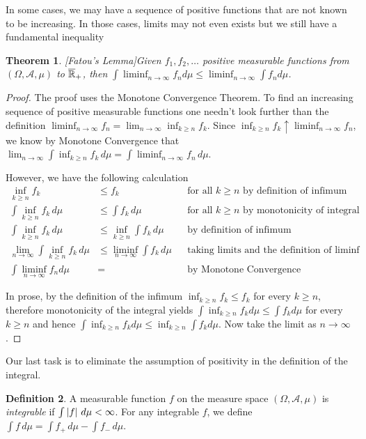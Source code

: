 \documentclass{amsart}
\newtheorem{thm}{Theorem}[section]
\theoremstyle{remark}
\theoremstyle{definition}
\newtheorem{defn}[thm]{Definition}
\begin{document}
 In some cases, we may have a sequence of positive functions that are not known
to be increasing.  In those cases, limits may not even exists but we
still have a fundamental inequality
\begin{thm}\label{Fatou}[Fatou's Lemma]Given $f_1, f_2, \dots$
  positive measurable functions from
  $(\Omega, \mathcal{A}, \mu)$ to $\overline{\mathbb{R}}_+$,
  then $\int \liminf_{n \to \infty} f_n d \mu \leq \liminf_{n \to
    \infty} \int f_n d \mu$.
\end{thm}
\begin{proof}The proof uses the Monotone Convergence Theorem.  To find
  an increasing sequence of positive measurable functions one needn't
  look further than the definition $\liminf_{n \to \infty} f_n =
  \lim_{n \to \infty} \inf_{k \geq n} f_k$.  Since $\inf_{k \geq n}
  f_k \uparrow \liminf_{n \to \infty} f_n$, we know by Monotone
  Convergence that $\lim_{n \to \infty} \int \inf_{k \geq n}
  f_k \, d \mu = \int \liminf_{n \to \infty} f_n \, d \mu$.  

However, we have the following calculation
\begin{align*}
\inf_{k \geq n} f_k &\leq f_k  & &\textrm{for all $k\geq n$ by
  definition of infimum} \\
\int \inf_{k \geq n} f_k \, d\mu &\leq \int f_k \,
d \mu & &\textrm{for all $k\geq n$ by
  monotonicity of integral} \\
\int \inf_{k \geq n} f_k \, d\mu &\leq \inf_{k \geq n} \int f_k \,
d \mu & &\textrm{by
  definition of infimum} \\
\lim_{n \to \infty} \int
\inf_{k \geq n} f_k \, d\mu &\leq \liminf_{n \to \infty} \int f_k \,
d \mu & &\textrm{taking limits and the
  definition of $\liminf$} \\
\int \liminf_{n \to \infty} f_n d \mu &= & & \textrm{by Monotone Convergence}
\end{align*}

In prose, by the  definition of the infimum $\inf_{k \geq n} f_k \leq f_k$ for every
  $k \geq n$, therefore monotonicity of the integral yields $\int
  \inf_{k \geq n} f_k d \mu \leq \int f_k d \mu$ for every
  $k \geq n$ and hence $\int
  \inf_{k \geq n} f_k d \mu \leq \inf_{k\geq n} \int f_k d \mu$.  Now
  take the limit as $n \to \infty$.
\end{proof}

Our last task is to eliminate the assumption of positivity in the
definition of the integral.  
\begin{defn}A measurable function $f$ on the measure space $(\Omega,
  \mathcal{A}, \mu)$ is \emph{integrable} if $\int \left \vert f \right \vert \, d\mu <
  \infty$.  For any integrable $f$, we define $\int f \, d \mu = \int
  f_+ \, d\mu - \int f_{-} \, d \mu$.
\end{defn}
\end{document}
